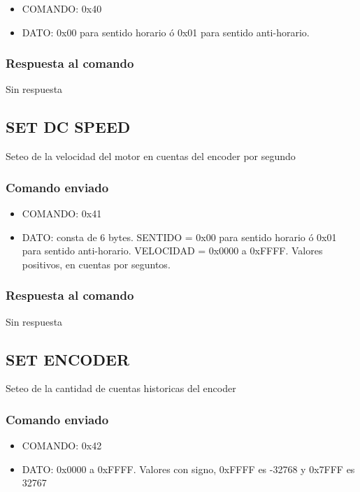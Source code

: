 \documentclass[a4paper,10pt]{article}
\begin{document}
\begin{itemize}
	\item{COMANDO:} 0x40
	\item{DATO:} 0x00 para sentido horario \'o 0x01 para sentido anti-horario.
\end{itemize}

\subsubsection*{Respuesta al comando}

Sin respuesta

\subsection{SET DC SPEED}
\label{set_dc_speed}

Seteo de la velocidad del motor en cuentas del encoder por segundo

\subsubsection*{Comando enviado}

\begin{itemize}
	\item{COMANDO:} 0x41
	\item{DATO:} consta de 6 bytes.
		SENTIDO = 0x00 para sentido horario \'o 0x01 para sentido anti-horario.
		VELOCIDAD = 0x0000 a 0xFFFF. Valores positivos, en cuentas por seguntos.
\end{itemize}

\subsubsection*{Respuesta al comando}

Sin respuesta

\subsection{SET ENCODER}
\label{set_encoder}

Seteo de la cantidad de cuentas historicas del encoder

\subsubsection*{Comando enviado}

\begin{itemize}
	\item{COMANDO:} 0x42
	\item{DATO:} 0x0000 a 0xFFFF. Valores con signo, 0xFFFF es -32768 y 0x7FFF es 32767
\end{itemize}
\end{document}
